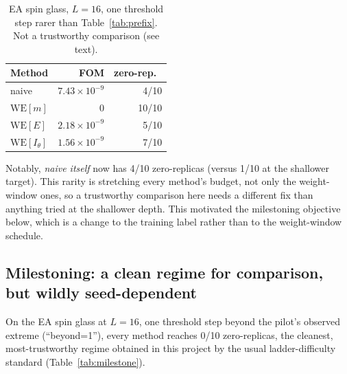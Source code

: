 \documentclass[11pt]{article}
\begin{document}
	\begin{table}[h]
		\centering\small
		\caption{EA spin glass, $L=16$, one threshold step rarer than Table~\ref{tab:prefix}. Not a
			trustworthy comparison (see text).}
		\label{tab:beyond2}
		\begin{tabular}{lrr}
			\toprule
			Method & FOM & zero-rep.\ \\
			\midrule
			naive & $7.43\times10^{-9}$ & 4/10 \\
			$\mathrm{WE}[m]$ & $0$ & 10/10 \\
			$\mathrm{WE}[E]$ & $2.18\times10^{-9}$ & 5/10 \\
			$\mathrm{WE}[I_\theta]$ & $1.56\times10^{-9}$ & 7/10 \\
			\bottomrule
		\end{tabular}
	\end{table}
	
	Notably, \emph{naive itself} now has 4/10 zero-replicas (versus 1/10 at the shallower
	target). This rarity is stretching every method's budget, not only the weight-window
	ones, so a trustworthy comparison here needs a different fix than anything tried at the
	shallower depth. This motivated the milestoning objective below, which is a change to the
	training label rather than to the weight-window schedule.
	
	\subsection{Milestoning: a clean regime for comparison, but wildly seed-dependent}
	\label{sec:milestone}
	On the EA spin glass at $L=16$, one threshold step beyond the pilot's observed extreme
	(``beyond=1''), every method reaches 0/10 zero-replicas, the cleanest,
	most-trustworthy regime obtained in this project by the usual ladder-difficulty standard
	(Table~\ref{tab:milestone}).
	
\end{document}
